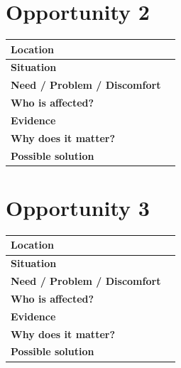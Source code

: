 \documentclass[12pt,a4paper]{article}
\begin{document}
	\vspace{0.15cm}
	
	\section*{Opportunity 2}
	
	\begin{center}
		\small
		\begin{tabular}{|L{0.22\textwidth}|L{0.61\textwidth}|}
			\hline
			\textbf{Location} & \rule{0pt}{0.5cm} \\
			\hline
			\textbf{Situation} & \rule{0pt}{0.5cm} \\
			\hline
			\textbf{Need / Problem / Discomfort} & \rule{0pt}{0.5cm} \\
			\hline
			\textbf{Who is affected?} & \rule{0pt}{0.45cm} \\
			\hline
			\textbf{Evidence} & \rule{0pt}{0.6cm} \\
			\hline
			\textbf{Why does it matter?} & \rule{0pt}{0.5cm} \\
			\hline
			\textbf{Possible solution} & \rule{0pt}{0.45cm} \\
			\hline
		\end{tabular}
	\end{center}
	
	\vspace{0.15cm}
	
	\section*{Opportunity 3}
	
	\begin{center}
		\small
		\begin{tabular}{|L{0.22\textwidth}|L{0.61\textwidth}|}
			\hline
			\textbf{Location} & \rule{0pt}{0.5cm} \\
			\hline
			\textbf{Situation} & \rule{0pt}{0.5cm} \\
			\hline
			\textbf{Need / Problem / Discomfort} & \rule{0pt}{0.5cm} \\
			\hline
			\textbf{Who is affected?} & \rule{0pt}{0.45cm} \\
			\hline
			\textbf{Evidence} & \rule{0pt}{0.6cm} \\
			\hline
			\textbf{Why does it matter?} & \rule{0pt}{0.5cm} \\
			\hline
			\textbf{Possible solution} & \rule{0pt}{0.45cm} \\
			\hline
		\end{tabular}
	\end{center}
	
\end{document}
